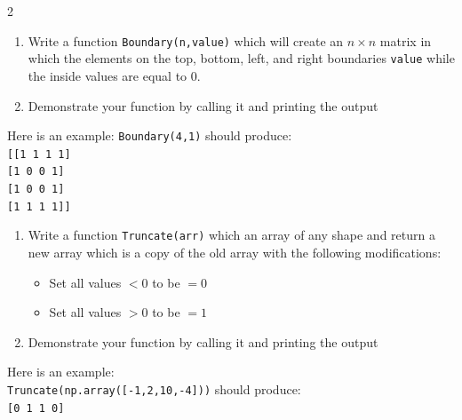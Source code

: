 \documentclass[12pt]{article}%
\newcommand{\code}[1]{\texttt{#1}}
\begin{document}
\begin{multicols*}{2}



\begin{Exercise}[origin={10 points, Python}]

\begin{enumerate}[leftmargin=*]
	\item Write a function \code{Boundary(n,value)} which will create an $n\times n$ matrix in which the elements on the top, bottom, left, and right boundaries \code{value} while the inside values are equal to 0.
	\item Demonstrate your function by calling it and printing the output
\end{enumerate}

Here is an example: \code{Boundary(4,1)} should produce: \\

\code{[[1 1 1 1] \\[0pt]
[1 0 0 1] \\[0pt]
[1 0 0 1] \\[0pt]
[1 1 1 1]]
}

\end{Exercise}

\begin{Exercise}[origin={10 points, Python}]

\begin{enumerate}[leftmargin=*]
	\item Write a function \code{Truncate(arr)} which an array of any shape and return a new array which is a copy of the old array with the following modifications:
	\begin{itemize}
		\item Set all values $<0$ to be $=0$
		\item Set all values $>0$ to be $=1$
	\end{itemize}
	\item Demonstrate your function by calling it and printing the output
\end{enumerate}

Here is an example: \\ \code{Truncate(np.array([-1,2,10,-4]))} should produce: \\

\code{[0 1 1 0]}

\end{Exercise}

\begin{Exercise}[origin={20 points, Python}]


\end{Exercise}
\end{multicols*}
\end{document}
